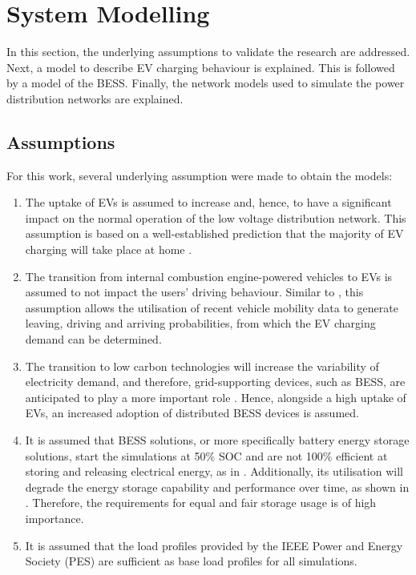 \section{System Modelling}
\label{ch4:sec:system-modelling}

In this section, the underlying assumptions to validate the research are addressed. Next, a model to describe EV charging behaviour is explained. This is followed by a model of the BESS. Finally, the network models used to simulate the power distribution networks are explained.

\subsection{Assumptions}
\label{ch4:subsec:assumptions}

For this work, several underlying assumption were made to obtain the models:
\begin{enumerate}[leftmargin=*,labelsep=5mm]
\item The uptake of EVs is assumed to increase and, hence, to have a significant impact on the normal operation of the low voltage distribution network. This assumption is based on a well-established prediction that the majority of EV charging will take place at home \cite{Munkhammar2015a}.
\item The transition from internal combustion engine-powered vehicles to EVs is assumed to not impact the users' driving behaviour. Similar to \cite{Dallinger2012}, this assumption allows the utilisation of recent vehicle mobility data \cite{MiD2008} to generate leaving, driving and arriving probabilities, from which the EV charging demand can be determined.
\item The transition to low carbon technologies will increase the variability of electricity demand, and therefore, grid-supporting devices, such as BESS, are anticipated to play a more important role \cite{FES2015}. Hence, alongside a high uptake of EVs, an increased adoption of distributed BESS devices is assumed.
\item It is assumed that BESS solutions, or more specifically battery energy storage solutions, start the simulations at 50\% SOC and are not 100\% efficient at storing and releasing electrical energy, as in \cite{Rowe2014a}. Additionally, its utilisation will degrade the energy storage capability and performance over time, as shown in \cite{Laresgoiti2015}. Therefore, the requirements for equal and fair storage usage is of high importance.
\item It is assumed that the load profiles provided by the IEEE Power and Energy Society (PES) are sufficient as base load profiles for all simulations.
\end{enumerate}

